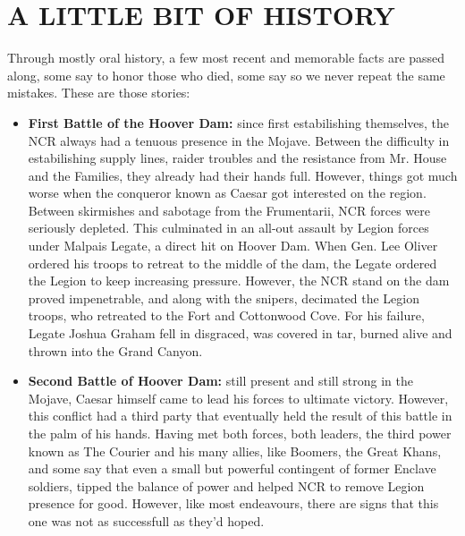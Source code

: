 \section{A LITTLE BIT OF HISTORY}

Through mostly oral history, a few most recent and memorable facts are passed along, some say to honor those who died, some say so we never repeat the same mistakes. These are those stories:

\begin{itemize}
	\item \textbf{First Battle of the Hoover Dam:} since first estabilishing themselves, the NCR always had a tenuous presence in the Mojave. Between the difficulty in estabilishing supply lines, raider troubles and the resistance from Mr. House and the Families, they already had their hands full. However, things got much worse when the conqueror known as Caesar got interested on the region. Between skirmishes and sabotage from the Frumentarii, NCR forces were seriously depleted. This culminated in an all-out assault by Legion forces under Malpais Legate, a direct hit on Hoover Dam. When Gen. Lee Oliver ordered his troops to retreat to the middle of the dam, the Legate ordered the Legion to keep increasing pressure. However, the NCR stand on the dam proved impenetrable, and along with the snipers, decimated the Legion troops, who retreated to the Fort and Cottonwood Cove. For his failure, Legate Joshua Graham fell in disgraced, was covered in tar, burned alive and thrown into the Grand Canyon. 
	
	\item \textbf{Second Battle of Hoover Dam:} still present and still strong in the Mojave, Caesar himself came to lead his forces to ultimate victory. However, this conflict had a third party that eventually held the result of this battle in the palm of his hands. Having met both forces, both leaders, the third power known as The Courier and his many allies, like Boomers, the Great Khans, and some say that even a small but powerful contingent of former Enclave soldiers, tipped the balance of power and helped NCR to remove Legion presence for good. However, like most endeavours, there are signs that this one was not as successfull as they'd hoped.
	

\end{itemize}
